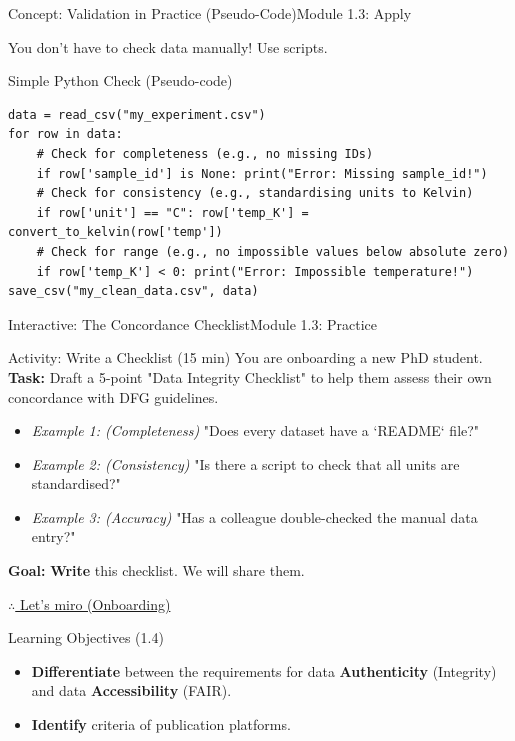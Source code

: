 \begin{frame}[fragile]{Concept: Validation in Practice (Pseudo-Code)}{Module 1.3: Apply}
    
    You don't have to check data manually! Use scripts.
    
    \begin{block}{Simple Python Check (Pseudo-code)}
\begin{verbatim}
data = read_csv("my_experiment.csv")
for row in data:
    # Check for completeness (e.g., no missing IDs)
    if row['sample_id'] is None: print("Error: Missing sample_id!")
    # Check for consistency (e.g., standardising units to Kelvin)
    if row['unit'] == "C": row['temp_K'] = convert_to_kelvin(row['temp'])
    # Check for range (e.g., no impossible values below absolute zero)
    if row['temp_K'] < 0: print("Error: Impossible temperature!")
save_csv("my_clean_data.csv", data)
\end{verbatim}
    \end{block}
\end{frame}

\begin{frame}{Interactive: The Concordance Checklist}{Module 1.3: Practice}
    \begin{block}{Activity: Write a Checklist (15 min)}
        You are onboarding a new PhD student.
        \pause
        \textbf{Task:} Draft a 5-point "Data Integrity Checklist" to help them assess their own concordance with DFG guidelines.
        \pause
        \begin{itemize}
            \item \emph{Example 1: (Completeness)} "Does every dataset have a `README` file?"
            \item \emph{Example 2: (Consistency)} "Is there a script to check that all units are standardised?"
            \item \emph{Example 3: (Accuracy)} "Has a colleague double-checked the manual data entry?"
        \end{itemize}
        \pause
        \textbf{Goal:} \textbf{Write} this checklist. We will share them.
    \end{block}
    \href{https://miro.com/app/board/uXjVJpI_9Kc=/?moveToWidget=3458764649162553531&cot=14}{$\therefore$ Let's miro (Onboarding)}
\end{frame}

\begin{frame}{Learning Objectives (1.4)}
    \begin{itemize}
        \item \textbf{Differentiate} between the requirements for data \textbf{Authenticity} (Integrity) and data \textbf{Accessibility} (FAIR).
        \item \textbf{Identify} criteria of publication platforms.
    \end{itemize}
\end{frame}

